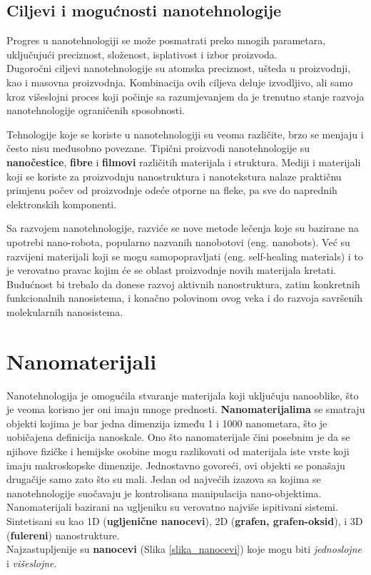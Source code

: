 \documentclass[a4paper]{article}
\begin{document}
\subsection{Ciljevi i mogućnosti nanotehnologije}
Progres u nanotehnologiji se može posmatrati preko mnogih parametara, uključujući preciznost, složenost, isplativost i izbor proizvoda.\\ 
Dugoročni ciljevi nanotehnologije su atomska preciznost, ušteda u proizvodnji, kao i masovna proizvodnja. Kombinacija ovih ciljeva deluje izvodljivo, ali samo kroz višeslojni proces koji počinje sa razumjevanjem da je trenutno stanje razvoja nanotehnologije ograničenih sposobnosti.

Tehnologije koje se koriste u nanotehnologiji su veoma različite, brzo se menjaju i često nisu međusobno povezane. Tipični proizvodi nanotehnologije su \textbf{nanočestice}, \textbf{fibre} i \textbf{filmovi} različitih materijala i struktura. 
Mediji i materijali koji se koriste za proizvodnju nanostruktura i nanotekstura nalaze praktičnu primjenu počev od proizvodnje odeće otporne na fleke, pa sve do naprednih elektronskih komponenti.

Sa razvojem nanotehnologije, razviće se nove metode lečenja koje su bazirane na upotrebi nano-robota, popularno nazvanih nanobotovi (eng. nanobots). Već su razvijeni materijali koji se mogu samopopravljati (eng. self-healing materials) i to je verovatno pravac kojim će se oblast proizvodnje novih materijala kretati.\\
Budućnost bi trebalo da donese razvoj aktivnih nanostruktura, zatim konkretnih funkcionalnih nanosistema, i konačno polovinom ovog veka i do razvoja savršenih molekularnih nanosistema.

\section{Nanomaterijali}

\sloppy Nanotehnologija je omogućila stvaranje materijala koji uključuju nanooblike, što je veoma korisno jer oni imaju mnoge prednosti. \textbf{Nanomaterijalima} se smatraju objekti kojima je bar jedna dimenzija između 1 i 1000 nanometara, što je uobičajena definicija nanoskale. Ono što nanomaterijale čini posebnim je da se njihove fizičke i hemijske osobine mogu razlikovati od materijala iste vrste koji imaju makroskopske dimenzije. Jednostavno govoreći, ovi objekti se ponašaju drugačije samo zato što su mali. Jedan od najvećih izazova sa kojima se nanotehnologije suočavaju je kontrolisana manipulacija nano-objektima. Nanomaterijali bazirani na ugljeniku su verovatno najviše ispitivani sistemi. Sintetisani su kao 1D (\textbf{ugljenične nanocevi}), 2D (\textbf{grafen, grafen-oksid}), i 3D (\textbf{fulereni}) nanostrukture.\\
Najzastupljenije su \textbf{nanocevi} (Slika \ref{slika_nanocevi}) koje mogu biti \emph{jednoslojne} i \emph{višeslojne}. 
\end{document}
